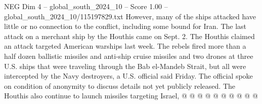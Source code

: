 \begin{textsample}{NEG Dim 4 – global\_south\_2024\_10 – Score 1.00 – global\_south\_2024\_10/115197829.txt}
However, many of the ships attacked have little or no connection to the conflict, including some bound for Iran.
The last attack on a merchant ship by the Houthis came on Sept. 2.
The Houthis claimed an attack targeted American warships last week.
The rebels fired more than a half dozen ballistic missiles and anti-ship cruise missiles and two drones at three U.S. ships that were traveling through the Bab el-Mandeb Strait, but all were intercepted by the Navy destroyers, a U.S. official said Friday.
The official spoke on condition of anonymity to discuss details not yet publicly released.
The Houthis also continue to launch missiles targeting Israel, @ @ @ @ @ @ @ @ @ @

\end{textsample}
